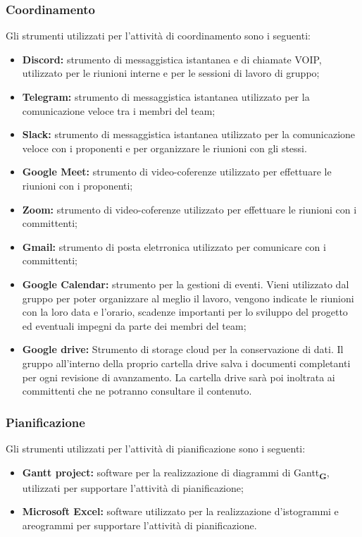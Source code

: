 \subsubsection{Coordinamento}
Gli strumenti utilizzati per l'attività di coordinamento sono i seguenti:
\begin{itemize}
    \item \textbf{Discord:} strumento di messaggistica istantanea e di chiamate VOIP, utilizzato per le riunioni interne e per le sessioni di lavoro di gruppo;
    \item \textbf{Telegram:} strumento di messaggistica istantanea utilizzato per la comunicazione veloce tra i membri del team;
    \item \textbf{Slack:} strumento di messaggistica istantanea utilizzato per la comunicazione veloce con i proponenti e per organizzare le riunioni con gli stessi.
    \item \textbf{Google Meet:} strumento di video-coferenze utilizzato per effettuare le riunioni con i proponenti;
    \item \textbf{Zoom:} strumento di video-coferenze utilizzato per effettuare le riunioni con i committenti;
    \item \textbf{Gmail:} strumento di posta eletrronica utilizzato per comunicare con i committenti;
    \item \textbf{Google Calendar:} strumento per la gestioni di eventi. Vieni utilizzato dal gruppo per poter organizzare al meglio il lavoro, vengono indicate le riunioni con la loro data e l'orario, scadenze importanti per lo sviluppo del progetto ed eventuali impegni da parte dei membri del team;
    \item \textbf{Google drive:} Strumento di storage cloud per la conservazione di dati. Il gruppo all'interno della proprio cartella drive salva i documenti completanti per ogni revisione di avanzamento. La cartella drive sarà poi inoltrata ai committenti che ne potranno consultare il contenuto.
\end{itemize}
\subsubsection{Pianificazione}
Gli strumenti utilizzati per l'attività di pianificazione sono i seguenti:
\begin{itemize}
    \item \textbf{Gantt project:} software per la realizzazione di diagrammi di Gantt\textsubscript{\textbf{G}}, utilizzati per supportare l'attività di pianificazione;
    \item \textbf{Microsoft Excel:} software utilizzato per la realizzazione d'istogrammi e areogrammi per supportare l'attività di pianificazione.
\end{itemize}
